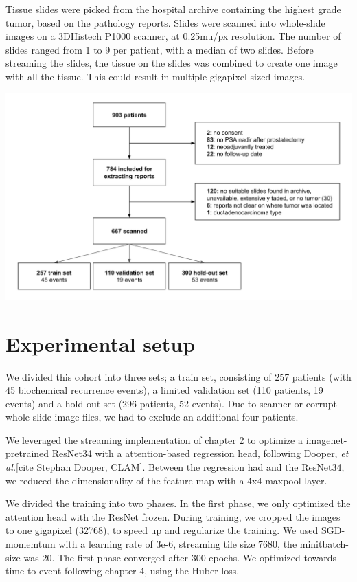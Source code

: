 \documentclass[
  12pt,
  a5,margin=2cmpaper,
]{article}
\begin{document}
Tissue slides were picked from the hospital archive containing the
highest grade tumor, based on the pathology reports. Slides were scanned
into whole-slide images on a 3DHistech P1000 scanner, at 0.25mu/px
resolution. The number of slides ranged from 1 to 9 per patient, with a
median of two slides. Before streaming the slides, the tissue on the
slides was combined to create one image with all the tissue. This could
result in multiple gigapixel-sized images.

\includegraphics{chpt5_imgs/inclusion.png}

\hypertarget{experimental-setup}{%
\section{Experimental setup}\label{experimental-setup}}

We divided this cohort into three sets; a train set, consisting of 257
patients (with 45 biochemical recurrence events), a limited validation
set (110 patients, 19 events) and a hold-out set (296 patients, 52
events). Due to scanner or corrupt whole-slide image files, we had to
exclude an additional four patients.

We leveraged the streaming implementation of chapter 2 to optimize a
imagenet-pretrained ResNet34 with a attention-based regression head,
following Dooper, \emph{et al.}{[}cite Stephan Dooper, CLAM{]}. Between
the regression had and the ResNet34, we reduced the dimensionality of
the feature map with a 4x4 maxpool layer.

We divided the training into two phases. In the first phase, we only
optimized the attention head with the ResNet frozen. During training, we
cropped the images to one gigapixel (32768), to speed up and regularize
the training. We used SGD-momemtum with a learning rate of 3e-6,
streaming tile size 7680, the minitbatch-size was 20. The first phase
converged after 300 epochs. We optimized towards time-to-event following
chapter 4, using the Huber loss.
\end{document}
